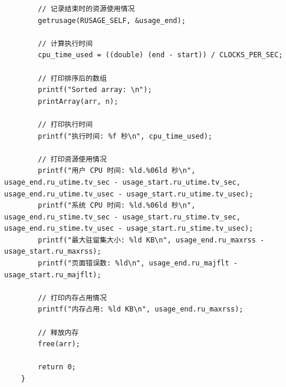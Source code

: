 \documentclass[UTF8]{ctexart}
\begin{document}
\begin{lstlisting}
        // 记录结束时的资源使用情况
        getrusage(RUSAGE_SELF, &usage_end);
    
        // 计算执行时间
        cpu_time_used = ((double) (end - start)) / CLOCKS_PER_SEC;
    
        // 打印排序后的数组
        printf("Sorted array: \n");
        printArray(arr, n);
    
        // 打印执行时间
        printf("执行时间: %f 秒\n", cpu_time_used);
    
        // 打印资源使用情况
        printf("用户 CPU 时间: %ld.%06ld 秒\n", usage_end.ru_utime.tv_sec - usage_start.ru_utime.tv_sec, usage_end.ru_utime.tv_usec - usage_start.ru_utime.tv_usec);
        printf("系统 CPU 时间: %ld.%06ld 秒\n", usage_end.ru_stime.tv_sec - usage_start.ru_stime.tv_sec, usage_end.ru_stime.tv_usec - usage_start.ru_stime.tv_usec);
        printf("最大驻留集大小: %ld KB\n", usage_end.ru_maxrss - usage_start.ru_maxrss);
        printf("页面错误数: %ld\n", usage_end.ru_majflt - usage_start.ru_majflt);
    
        // 打印内存占用情况
        printf("内存占用: %ld KB\n", usage_end.ru_maxrss);
    
        // 释放内存
        free(arr);
    
        return 0;
    }
\end{lstlisting}
\end{document}
